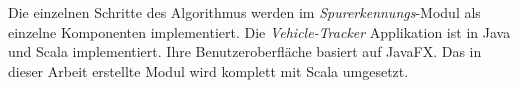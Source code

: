 Die einzelnen Schritte des Algorithmus werden im \textit{Spurerkennungs}-Modul als einzelne Komponenten
implementiert.
Die \textit{Vehicle-Tracker} Applikation ist in Java und Scala implementiert. Ihre Benutzeroberfläche basiert
auf JavaFX. Das in dieser Arbeit erstellte Modul wird komplett mit Scala umgesetzt.